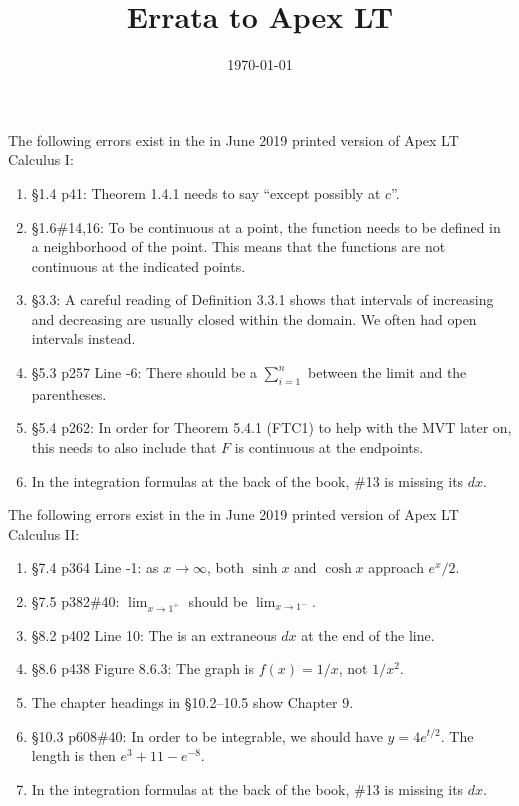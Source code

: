 \documentclass{amsart}
\title{Errata to Apex LT}
\date{\today}
\newcommand{\ds}{\displaystyle}
\begin{document}

\maketitle

\noindent
The following errors exist in the in June 2019 printed version of Apex LT Calculus I:
\begin{enumerate}
\item \S1.4 p41: Theorem 1.4.1 needs to say ``except possibly at $c$''.
\item \S1.6\#14,16: To be continuous at a point, the function needs to be defined in a neighborhood of the point.  This means that the functions are not continuous at the indicated points.
\item \S3.3: A careful reading of Definition 3.3.1 shows that intervals of increasing and decreasing are usually closed within the domain.  We often had open intervals instead.
\item \S5.3 p257 Line -6: There should be a $\ds\sum_{i=1}^n$ between the limit and the parentheses.
\item \S5.4 p262: In order for Theorem 5.4.1 (FTC1) to help with the MVT later on, this needs to also include that $F$ is continuous at the endpoints.
\item In the integration formulas at the back of the book, \#13 is missing its $dx$.
\label{2019-06-00Iplus}
\end{enumerate}

\noindent
The following errors exist in the in June 2019 printed version of Apex LT Calculus II:
\begin{enumerate}
\item \S7.4 p364 Line -1: as $x\to\infty$, both $\sinh x$ and $\cosh x$ approach $e^x/2$.
\item \S7.5 p382\#40: $\ds\lim_{x\to1^+}$ should be $\ds\lim_{x\to1^-}$.
\item \S8.2 p402 Line 10: The is an extraneous $dx$ at the end of the line.
\item \S8.6 p438 Figure 8.6.3: The graph is $f(x)=1/x$, not $1/x^2$.
\item The chapter headings in \S10.2--10.5 show Chapter 9.
\item \S10.3 p608\#40: In order to be integrable, we should have $y=4e^{t/2}$.  The length is then $e^3+11-e^{-8}$.
\item In the integration formulas at the back of the book, \#13 is missing its $dx$.
\label{2019-06-00II}
\end{enumerate}
\end{document}
